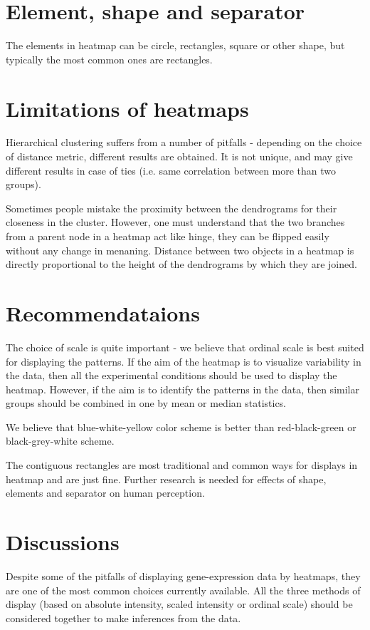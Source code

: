 \documentclass[12pt, oneside, letterpaper]{article}
\begin{document}
\section*{Element, shape and separator}
	The elements in heatmap can be circle, rectangles, square or
	other shape, but typically the most common ones are
	rectangles.

\section*{Limitations of heatmaps}
	Hierarchical clustering suffers from a number of pitfalls -
	depending on the choice of distance metric, different
	results are obtained. It is not unique, and may give
	different results in case of ties (i.e. same correlation
	between more than two groups).

	Sometimes people mistake the proximity between the
	dendrograms for their closeness in the cluster. However, one
	must understand that the two branches from a parent node in
	a heatmap act like hinge, they can be flipped easily without
	any change in menaning. Distance between two objects in a
	heatmap is directly proportional to the height of the
	dendrograms by which they are joined.


\section*{Recommendataions}

	The choice of scale is quite important - we believe that
	ordinal scale is best suited for displaying the patterns. If
	the aim of the heatmap is to visualize variability in the
	data, then all the experimental conditions should be used to
	display the heatmap. However, if the aim is to identify the
	patterns in the data, then similar groups should be combined
	in one by mean or median statistics.

   	We believe that blue-white-yellow color scheme
   	is better than red-black-green or black-grey-white
   	scheme. 

	The contiguous rectangles are most traditional and common
	ways for displays in heatmap and are just fine. Further
	research is needed for effects of shape, elements and
	separator on human perception.


\section*{Discussions}

	Despite some of the pitfalls of displaying gene-expression
	data by heatmaps, they are one of the most common choices
	currently available. All the three methods of display (based
	on absolute intensity, scaled intensity or ordinal scale)
	should be considered together to make inferences from the
	data.
\end{document}
